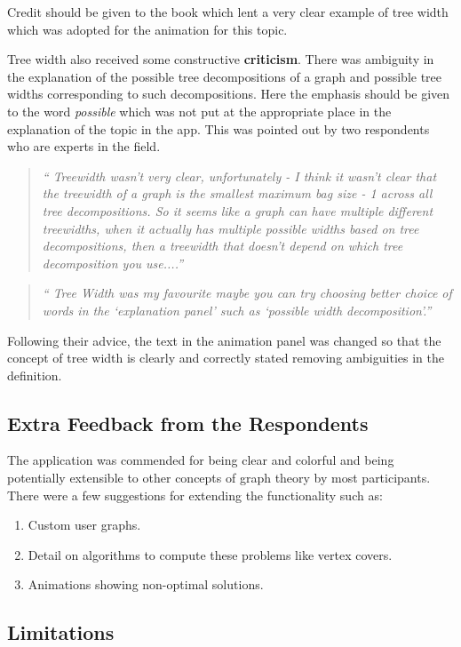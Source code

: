 Credit should be given to the book \cite{KleinbergTardos06} which lent a very
clear example of tree width which was adopted for the animation for this topic.

Tree width also received some constructive \textbf{criticism}. There was
ambiguity in the explanation of the possible tree decompositions of a graph and
possible tree widths corresponding to such decompositions. Here the emphasis
should be given to the word \emph{possible} which was not put at the appropriate
place in the explanation of the topic in the app. This was pointed out
by two respondents who are experts in the field. 

\begin{quote}
\emph{``
Treewidth wasn't very clear, unfortunately - I think it wasn't clear that the
treewidth of a graph is the smallest maximum bag size - 1 across all tree
decompositions. So it seems like a graph can have multiple different
treewidths, when it actually has multiple possible widths based on tree
decompositions, then a treewidth that doesn't depend on which tree
decomposition you use....''}
\end{quote}
\begin{quote}
\emph{``
Tree Width was my favourite maybe
you can try choosing better choice of words in the `explanation panel'  such as
`possible width decomposition'.''}
\end{quote}

Following their advice, the text in the animation panel was changed so that
the concept of tree width is clearly and correctly stated removing ambiguities
in the definition.


\subsection{Extra Feedback from the Respondents}
The application was commended for being clear and colorful and being
potentially extensible to other concepts of graph theory by most participants.
There were a few suggestions for extending the functionality such as:
\begin{enumerate}
\item Custom user graphs.
\item Detail on algorithms to compute these problems like vertex covers.
\item Animations showing non-optimal solutions.
\end{enumerate}


\subsection{Limitations}


